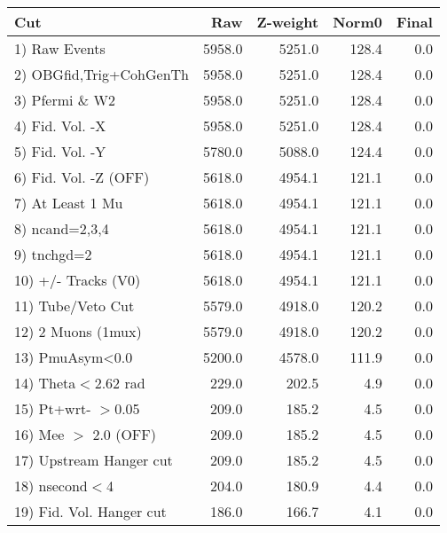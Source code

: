  \begin{table}[h!]\centering
 \begin{tabular}{||l||r|r|r|r||}
 \hline
 \hline
 Cut & Raw & Z-weight & Norm0 & Final \\
 \hline
  1) Raw Events           &      5958.0 &      5251.0 &       128.4 &         0.0 \\
  2) OBGfid,Trig+CohGenTh &      5958.0 &      5251.0 &       128.4 &         0.0 \\
  3) Pfermi \& W2         &      5958.0 &      5251.0 &       128.4 &         0.0 \\
  4) Fid. Vol. -X         &      5958.0 &      5251.0 &       128.4 &         0.0 \\
  5) Fid. Vol. -Y         &      5780.0 &      5088.0 &       124.4 &         0.0 \\
  6) Fid. Vol. -Z (OFF)   &      5618.0 &      4954.1 &       121.1 &         0.0 \\
  7) At Least 1 Mu        &      5618.0 &      4954.1 &       121.1 &         0.0 \\
  8) ncand=2,3,4          &      5618.0 &      4954.1 &       121.1 &         0.0 \\
  9) tnchgd=2             &      5618.0 &      4954.1 &       121.1 &         0.0 \\
 10) +/- Tracks (V0)      &      5618.0 &      4954.1 &       121.1 &         0.0 \\
 11) Tube/Veto Cut        &      5579.0 &      4918.0 &       120.2 &         0.0 \\
 12) 2 Muons (1mux)       &      5579.0 &      4918.0 &       120.2 &         0.0 \\
 13) PmuAsym<0.0          &      5200.0 &      4578.0 &       111.9 &         0.0 \\
 14) Theta$<$2.62 rad     &       229.0 &       202.5 &         4.9 &         0.0 \\
 15) Pt+wrt- $>$0.05      &       209.0 &       185.2 &         4.5 &         0.0 \\
 16) Mee $>$ 2.0  (OFF)   &       209.0 &       185.2 &         4.5 &         0.0 \\
 17) Upstream Hanger cut  &       209.0 &       185.2 &         4.5 &         0.0 \\
 18) nsecond$<$4          &       204.0 &       180.9 &         4.4 &         0.0 \\
 19) Fid. Vol. Hanger cut &       186.0 &       166.7 &         4.1 &         0.0 \\

\end{tabular}
\end{table}
